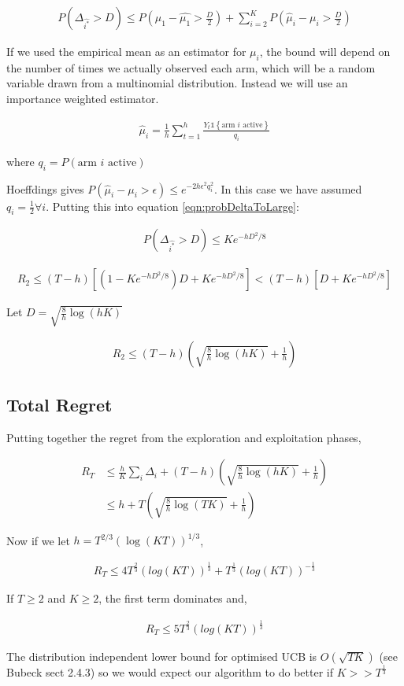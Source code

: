 \documentclass{article}
\newcommand{\set}[1]{\left\{#1\right\}}
\newcommand{\ind}[1]{\mathds{1}\!\!\set{#1}}
\newcommand{\eqn}[1]{\begin{align}#1\end{align}}
\theoremstyle{plain}
\theoremstyle{definition}
\begin{document}
\eqn{
\label{eqn:probDeltaToLarge}
P(\Delta_{\hat{i^*}} > D) \leq  P(\mu_1 - \hat{\mu_1} > \frac{D}{2})+ \sum_{i=2}^K P(\hat{\mu}_i - \mu_{i} > \frac{D}{2})
}

If we used the empirical mean as an estimator for $\mu_i$, the bound will depend on the number of times we actually observed each arm, which will be a random variable drawn from a multinomial distribution. Instead we will use an importance weighted estimator.

\eqn{
\label{eqn:importance_weighted_estimator}
\hat{\mu}_i = \frac{1}{h}\sum_{t=1}^h \frac{Y_t\ind{\text{arm $i$ active}}}{q_i}
}

where $q_i = P(\text{arm $i$ active})$

Hoeffdings gives $ P(\hat{\mu}_i - \mu_{i} > \epsilon) \leq e^{-2h\epsilon^2q_i^2}$. In this case we have assumed $q_i = \frac{1}{2} \forall i$. Putting this into equation \ref{eqn:probDeltaToLarge}:

\eqn{
\label{eqn:balancedHoeffdings}
P(\Delta_{\hat{i^*}} > D) \leq Ke^{-hD^2/8}
}


\eqn{
R_2 \leq (T-h)[(1-K e^{-hD^2/8})D + K e^{-hD^2/8}] < (T-h)[D + K e^{-hD^2/8}]
}

Let $D = \sqrt{\frac{8}{h}\log(hK)}$ 

\eqn{
R_2 \leq (T-h)\left(\sqrt{\frac{8}{h}\log(hK)} + \frac{1}{h}\right)
}


\subsection*{Total Regret}

Putting together the regret from the exploration and exploitation phases,

\eqn{
R_T & \leq \frac{h}{K}\sum_i \Delta_i + (T-h)\left(\sqrt{\frac{8}{h}\log(hK)} + \frac{1}{h}\right)\\
& \leq h + T\left(\sqrt{\frac{8}{h}\log(TK)} + \frac{1}{h}\right)
}

Now if we let $h = T^{2/3}(\log(KT))^{1/3}$,


\eqn {
R_T \leq 4T^{\frac{2}{3}}(log(KT))^{\frac{1}{3}} + T^{\frac{1}{3}}(log(KT))^{-\frac{1}{3}}
}

If $T \geq 2$ and $K \geq 2$, the first term dominates and,

\eqn {
R_T  \leq 5T^{\frac{2}{3}}(log(KT))^{\frac{1}{3}}
}

The distribution independent lower bound for optimised UCB is $O(\sqrt{TK})$ (see Bubeck sect 2.4.3) so we would expect our algorithm to do better if $K >> T^{\frac{1}{3}}$
\end{document}
